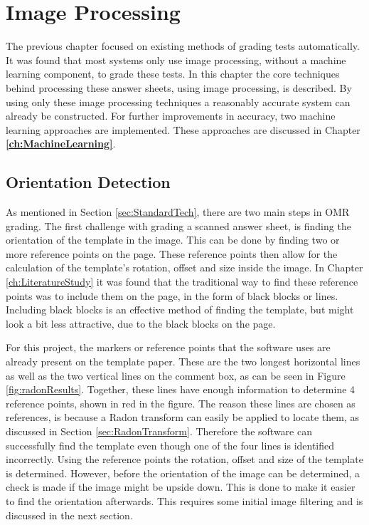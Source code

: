 \chapter{Image Processing}
\label{ch:ImageProcessing}
\graphicspath{{Chapter3/Chapter3Figures/}}
The previous chapter focused on existing methods of grading tests automatically. It was found that most systems only use image processing, without a machine learning component, to grade these tests. In this chapter the core techniques behind processing these answer sheets, using image processing, is described. By using only these image processing techniques a reasonably accurate system can already be constructed. For further improvements in accuracy, two machine learning approaches are implemented. These approaches are discussed in Chapter \textbf{\ref{ch:MachineLearning}}.

\section{Orientation Detection}
\label{sec:orientDetect}
As mentioned in Section \ref{sec:StandardTech}, there are two main steps in OMR grading. The first challenge with grading a scanned answer sheet, is finding the orientation of the template in the image. This can be done by finding two or more reference points on the page. These reference points then allow for the calculation of the template's rotation, offset and size inside the image. In Chapter \ref{ch:LiteratureStudy} it was found that the traditional way to find these reference points was to include them on the page, in the form of black blocks or lines. Including black blocks is an effective method of finding the template, but might look a bit less attractive, due to the black blocks on the page.

For this project, the markers or reference points that the software uses are already present on the template paper. These are the two longest horizontal lines as well as the two vertical lines on the comment box, as can be seen in Figure \ref{fig:radonResults}. Together, these lines have enough information to determine 4 reference points, shown in red in the figure. The reason these lines are chosen as references, is because a Radon transform can easily be applied to locate them, as discussed in Section \ref{sec:RadonTransform}. Therefore the software can successfully find the template even though one of the four lines is identified incorrectly. Using the reference points the rotation, offset and size of the template is determined. However, before the orientation of the image can be determined, a check is made if the image might be upside down. This is done to make it easier to find the orientation afterwards. This requires some initial image filtering and is discussed in the next section.

